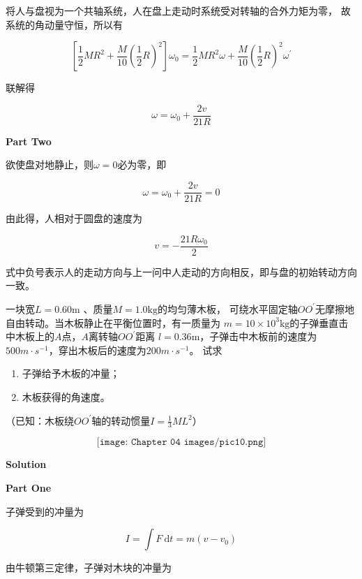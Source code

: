 \documentclass[
	12pt, %
	a4paper, %
]{myLegrandOrangeBook}
\begin{document}
    将人与盘视为一个共轴系统，人在盘上走动时系统受对转轴的合外力矩为零，
    故系统的角动量守恒，所以有

    $$
        \left[\frac{1}{2} M R^2+\frac{M}{10}\left(\frac{1}{2} R\right)^2\right] \omega_0=
        \frac{1}{2} M R^2 \omega+\frac{M}{10}\left(\frac{1}{2} R\right)^2 \omega^{\prime}
    $$

    联解得

    $$
        \omega=\omega_0+\frac{2 v}{21 R}
    $$

    \textbf{Part Two}

    欲使盘对地静止，则\(\omega=0\)必为零，即
    
    $$
        \omega=\omega_0+\frac{2 v}{21 R}=0
    $$

    由此得，人相对于圆盘的速度为

    $$
        v=-\frac{21 R \omega_0}{2}
    $$

    式中负号表示人的走动方向与上一问中人走动的方向相反，即与盘的初始转动方向一致。
    \vspace{1em}

\begin{exercise}
    一块宽\(L=0.60\mathrm{m}\) 、质量\(M=1.0\mathrm{kg}\)的均匀薄木板，
    可绕水平固定轴\(OO^{\prime}\)无摩擦地自由转动。当木板静止在平衡位置时，有一质量为
    \(m = 10 \times 10^3 \mathrm{kg}\)的子弹垂直击中木板上的\(A\)点，\(A\)离转轴\(OO^{\prime}\)距离
    \(l = 0.36\mathrm{m}\)，子弹击中木板前的速度为\(500 m \cdot s^{-1}\)，穿出木板后的速度为\(200 m \cdot s^{-1}\)。
    试求

    \begin{enumerate}
        \item 子弹给予木板的冲量；
        \item 木板获得的角速度。
    \end{enumerate}

    （已知：木板绕\(OO^{\prime}\)轴的转动惯量\(I=\frac{1}{3}ML^2\)）

    \[
        \texttt{[image: Chapter 04 images/pic10.png]}
    \]
\end{exercise}

    \vspace{1em}
    \textbf{Solution}
    
    \textbf{Part One}

    子弹受到的冲量为

    $$
        I=\int F \mathrm{~d} t=m\left(v-v_0\right)
    $$
    
    由牛顿第三定律，子弹对木块的冲量为
\end{document}
